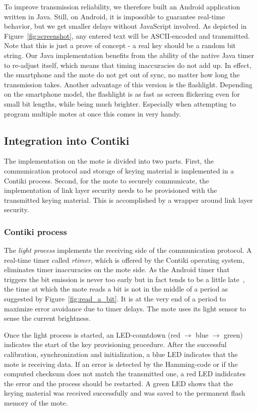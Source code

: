 \documentclass{ewsn-proc} %
\begin{document}
To improve transmission reliability, we therefore built an Android application written in Java.
Still, on Android, it is impossible to guarantee real-time behavior, but we get smaller delays without JavaScript involved.
As depicted in Figure~\ref{fig:screenshot}, any entered text will be ASCII-encoded and transmitted.
Note that this is just a prove of concept - a real key should be a random bit string.
Our Java implementation benefits from the ability of the native Java timer to re-adjust itself, which means that timing inaccuracies do not add up.
In effect, the smartphone and the mote do not get out of sync, no matter how long the transmission takes.
Another advantage of this version is the flashlight.
Depending on the smartphone model, the flashlight is as fast as screen flickering even for small bit lengths, while being much brighter.
Especially when attempting to program multiple motes at once this comes in very handy.


\subsection{Integration into Contiki}
\label{sub:mote}

The implementation on the mote is divided into two parts.
First, the communication protocol and storage of keying material is implemented in a Contiki process.
Second, for the mote to securely communicate, the implementation of link layer security needs to be provisioned with the transmitted keying material.
This is accomplished by a wrapper around link layer security.

\subsubsection{Contiki process}
\label{ssub:contiki_process}

The \textit{light process} implements the receiving side of the communication protocol.
A real-time timer called \textit{rtimer}, which is offered by the Contiki operating system, eliminates timer inaccuracies on the mote side.
As the Android timer that triggers the bit emission is never too early but in fact tends to be a little late~\cite{mongia2010reliable}, the time at which the mote reads a bit is not in the middle of a period as suggested by Figure~\ref{fig:read_a_bit}.
It is at the very end of a period to maximize error avoidance due to timer delays.
The mote uses its light sensor to sense the current brightness.

Once the light process is started, an LED-countdown (red $\rightarrow$ blue $\rightarrow$ green) indicates the start of the key provisioning procedure.
After the successful calibration, synchronization and initialization, a blue LED indicates that the mote is receiving data.
If an error is detected by the Hamming-code or if the computed checksum does not match the transmitted one, a red LED indidcates the error and the process should be restarted.
A green LED shows that the keying material was received successfully and was saved to the permanent flash memory of the mote.
\end{document}
